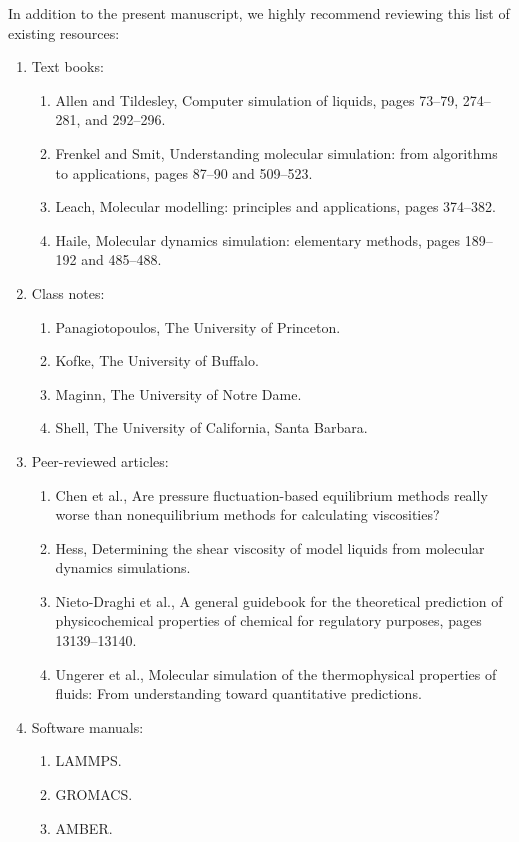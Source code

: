 \documentclass[9pt,bestpractices]{livecoms}
\begin{document}
In addition to the present manuscript, we highly recommend reviewing this list of existing resources:
\begin{enumerate}
	\item Text books:
	\begin{enumerate}
		\item Allen and Tildesley, Computer simulation of liquids, pages 73--79, 274--281, and 292--296. \cite{Allen2017}
		\item Frenkel and Smit, Understanding molecular simulation: from algorithms to applications, pages 87--90 and 509--523. \cite{Frenkel2002}
		\item Leach, Molecular modelling: principles and applications, pages 374--382. \cite{Leach2001}
		\item Haile, Molecular dynamics simulation: elementary methods, pages 189--192 and 485--488. \cite{Haile1992}
	\end{enumerate}
	\item Class notes:
	\begin{enumerate}
		\item Panagiotopoulos, The University of Princeton. \cite{PanaNotes}
		\item Kofke, The University of Buffalo. \cite{KofkeNotes}
		\item Maginn, The University of Notre Dame. \cite{MaginnNotes}
		\item Shell, The University of California, Santa Barbara. \cite{ShellNotes}
	\end{enumerate}
	\item Peer-reviewed articles:
	\begin{enumerate}
		\item Chen et al., Are pressure fluctuation-based equilibrium methods really worse than nonequilibrium methods for calculating viscosities? \cite{Chen2009}
		\item Hess, Determining the shear viscosity of model liquids from molecular dynamics simulations. \cite{Hess2002}
		\item Nieto-Draghi et al., A general guidebook for the theoretical prediction of physicochemical properties of chemical for regulatory purposes, pages 13139--13140. \cite{Nieto2015}
		\item Ungerer et al., Molecular simulation of the thermophysical properties of fluids: From understanding toward quantitative predictions. \cite{Ungerer2007}
	\end{enumerate}
	\item Software manuals:
	\begin{enumerate}
		\item LAMMPS. \cite{LAMMPS}
		\item GROMACS. \cite{GROMACS}
		\item AMBER. \cite{AMBER2018}
	\end{enumerate}
\end{enumerate}
\end{document}
